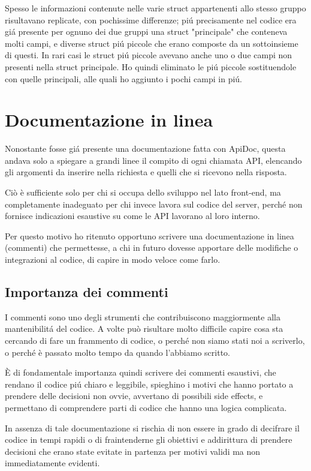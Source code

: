 \documentclass[italian, oneside]{sapthesis} %
\begin{document}
		Spesso le informazioni contenute nelle varie struct appartenenti allo stesso gruppo risultavano replicate, con pochissime differenze; pi\'u precisamente nel codice era gi\'a presente per ognuno dei due gruppi una struct "principale" che conteneva molti campi, e diverse struct pi\'u piccole che erano composte da un sottoinsieme di questi. In rari casi le struct pi\'u piccole avevano anche uno o due campi non presenti nella struct principale. Ho quindi eliminato le pi\'u piccole sostituendole con quelle principali, alle quali ho aggiunto i pochi campi in pi\'u.

\chapter{Documentazione in linea}
	Nonostante fosse gi\'a presente una documentazione fatta con ApiDoc, questa andava solo a spiegare a grandi linee il compito di ogni chiamata API, elencando gli argomenti da inserire nella richiesta e quelli che si ricevono nella risposta.

	Ci\`o \`e sufficiente solo per chi si occupa dello sviluppo nel lato front-end, ma completamente inadeguato per chi invece lavora sul codice del server, perch\'e non fornisce indicazioni esaustive su come le API lavorano al loro interno.

	Per questo motivo ho ritenuto opportuno scrivere una documentazione in linea (commenti) che permettesse, a chi in futuro dovesse apportare delle modifiche o integrazioni al codice, di capire in modo veloce come farlo.

	\section{Importanza dei commenti}
		I commenti sono uno degli strumenti che contribuiscono maggiormente alla mantenibilit\'a del codice. A volte pu\`o risultare molto difficile capire cosa sta cercando di fare un frammento di codice, o perch\'e non siamo stati noi a scriverlo, o perch\'e \`e passato molto tempo da quando l'abbiamo scritto.
		
		\`E di fondamentale importanza quindi scrivere dei commenti esaustivi, che rendano il codice pi\'u chiaro e leggibile, spieghino i motivi che hanno portato a prendere delle decisioni non ovvie, avvertano di possibili side effects, e permettano di comprendere parti di codice che hanno una logica complicata.

		In assenza di tale documentazione si rischia di non essere in grado di decifrare il codice in tempi rapidi o di fraintenderne gli obiettivi e addirittura di prendere decisioni che erano state evitate in partenza per motivi validi ma non immediatamente evidenti.
\end{document}

